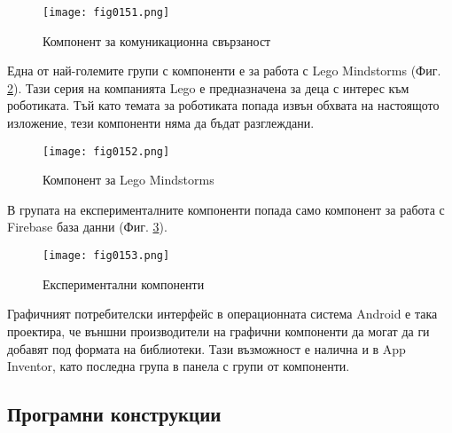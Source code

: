 \begin{figure}[H]
  \centering
  \texttt{[image: fig0151.png]}
  \caption{Компонент за комуникационна свързаност}
\label{fig0151}
\end{figure}

Една от най-големите групи с компоненти е за работа с Lego Mindstorms (Фиг. \ref{fig0152}). Тази серия на компанията Lego е предназначена за деца с интерес към роботиката. Тъй като темата за роботиката попада извън обхвата на настоящото изложение, тези компоненти няма да бъдат разглеждани. 

\begin{figure}[H]
  \centering
  \texttt{[image: fig0152.png]}
  \caption{Компонент за Lego Mindstorms}
\label{fig0152}
\end{figure}

В групата на експерименталните компоненти попада само компонент за работа с Firebase база данни (Фиг. \ref{fig0153}).

\begin{figure}[H]
  \centering
  \texttt{[image: fig0153.png]}
  \caption{Експериментални компоненти}
\label{fig0153}
\end{figure}

Графичният потребителски интерфейс в операционната система Android е така проектира, че външни производители на графични компоненти да могат да ги добавят под формата на библиотеки. Тази възможност е налична и в App Inventor, като последна група в панела с групи от компоненти. 

\subsection{Програмни конструкции}

